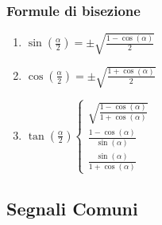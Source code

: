             \subsubsection{Formule di bisezione}\label{Trigonometria_Bisezione}
                \begin{enumerate}
                    \item {
                        $\sin(\frac{\alpha}{2}) =\pm\sqrt{\frac{1-\cos(\alpha)}{2}}$ 
                    }
                    \item {
                        $\cos(\frac{\alpha}{2}) =\pm\sqrt{\frac{1+\cos(\alpha)}{2}}$ 
                    }
                    \item {
                        $
                            \tan(\frac{\alpha}{2})
                            \begin{cases}
                                \sqrt{\frac{1-\cos(\alpha)}{1+\cos(\alpha)}} \\
                                \frac{1-\cos(\alpha)}{\sin(\alpha)}\\
                                \frac{\sin(\alpha)}{1+\cos(\alpha)}
                            \end{cases}
                        $
                    }
                \end{enumerate}
    \subsection{Segnali Comuni}\label{Segnali Comuni}
